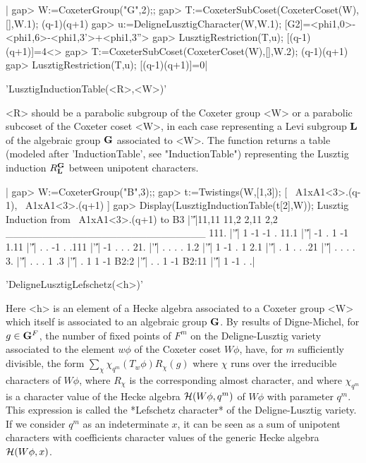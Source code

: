 |    gap> W:=CoxeterGroup("G",2);;
    gap> T:=CoxeterSubCoset(CoxeterCoset(W),[],W.1);
    (q-1)(q+1)
    gap> u:=DeligneLusztigCharacter(W,W.1);
    [G2]=<phi{1,0}>-<phi{1,6}>-<phi{1,3}'>+<phi{1,3}''>
    gap> LusztigRestriction(T,u);
    [(q-1)(q+1)]=4<>
    gap> T:=CoxeterSubCoset(CoxeterCoset(W),[],W.2);
    (q-1)(q+1)
    gap> LusztigRestriction(T,u);
    [(q-1)(q+1)]=0|


'LusztigInductionTable(<R>,<W>)'

<R> should be a parabolic subgroup of the Coxeter group <W> or a parabolic
subcoset  of  the  Coxeter  coset  <W>,  in  each  case representing a Levi
subgroup ${\bf L}$ of the algebraic group ${\bf G}$ associated to <W>. The function
returns  a  table  (modeled  after  'InductionTable', see "InductionTable")
representing   the   Lusztig   induction   $R_{\bf L}^{\bf G}$   between  unipotent
characters.

|    gap> W:=CoxeterGroup("B",3);;
    gap> t:=Twistings(W,[1,3]);
    [ ~A1xA1<3>.(q-1), ~A1xA1<3>.(q+1) ]
    gap> Display(LusztigInductionTable(t[2],W));
    Lusztig Induction from ~A1xA1<3>.(q+1) to B3
          |'\|'|11,11 11,2 2,11 2,2
    ___________________________
    111.  |'\|'|    1   -1   -1   .
    11.1  |'\|'|   -1    .    1  -1
    1.11  |'\|'|    .    .   -1   .
    .111  |'\|'|   -1    .    .   .
    21.   |'\|'|    .    .    .   .
    1.2   |'\|'|    1   -1    .   1
    2.1   |'\|'|    .    1    .   .
    .21   |'\|'|    .    .    .   .
    3.    |'\|'|    .    .    .   1
    .3    |'\|'|    .    1    1  -1
    B2:2  |'\|'|    .    .    1  -1
    B2:11 |'\|'|    1   -1    .   .|


'DeligneLusztigLefschetz(<h>)'

Here <h> is an element of a Hecke algebra associated to a Coxeter group <W>
which  itself  is  associated  to  an  algebraic group ${\bf G}$. By results of
Digne-Michel,  for $g\in{\bf G}^F$, the number of  fixed points of $F^m$ on the
Deligne-Lusztig  variety associated to  the element $w\phi$  of the Coxeter
coset  $W\phi$, have, for  $m$ sufficiently divisible,  the form $\sum_\chi
\chi_{q^m}(T_w\phi)R_\chi(g)$   where  $\chi$  runs  over  the  irreducible
characters   of  $W\phi$,  where  $R_\chi$   is  the  corresponding  almost
character, and where $\chi_{q^m}$ is a character value of the Hecke algebra
${\cal  H}(W\phi,q^m)$ of $W\phi$ with  parameter $q^m$. This expression is
called  the  *Lefschetz  character*  of  the Deligne-Lusztig variety. If we
consider  $q^m$  as  an  indeterminate  $x$,  it  can  be  seen as a sum of
unipotent  characters  with  coefficients  character  values of the generic
Hecke algebra ${\cal H}(W\phi,x)$.

